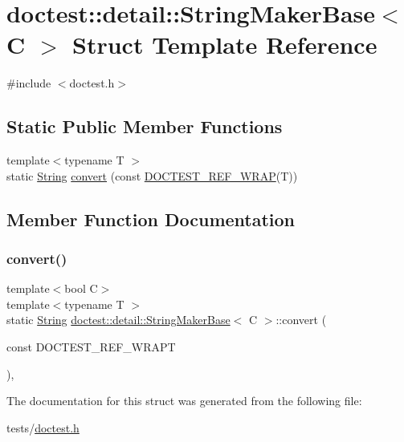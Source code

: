 \hypertarget{structdoctest_1_1detail_1_1StringMakerBase}{}\section{doctest\+:\+:detail\+:\+:String\+Maker\+Base$<$ C $>$ Struct Template Reference}
\label{structdoctest_1_1detail_1_1StringMakerBase}


{\ttfamily \#include $<$doctest.\+h$>$}

\subsection*{Static Public Member Functions}
\begin{DoxyCompactItemize}
\item 
{\footnotesize template$<$typename T $>$ }\\static \hyperlink{classdoctest_1_1String}{String} \hyperlink{structdoctest_1_1detail_1_1StringMakerBase_a67d29f2a5de9a522d8e8607c1a39db9b}{convert} (const \hyperlink{doctest_8h_af2901cafb023c57fb672ccb1bf14f2eb}{D\+O\+C\+T\+E\+S\+T\+\_\+\+R\+E\+F\+\_\+\+W\+R\+AP}(T))
\end{DoxyCompactItemize}


\subsection{Member Function Documentation}
\mbox{\label{structdoctest_1_1detail_1_1StringMakerBase_a67d29f2a5de9a522d8e8607c1a39db9b}} 
\subsubsection{\texorpdfstring{convert()}{convert()}}
{\footnotesize\ttfamily template$<$bool C$>$ \\
template$<$typename T $>$ \\
static \hyperlink{classdoctest_1_1String}{String} \hyperlink{structdoctest_1_1detail_1_1StringMakerBase}{doctest\+::detail\+::\+String\+Maker\+Base}$<$ C $>$\+::convert (\begin{DoxyParamCaption}\item[{const }]{D\+O\+C\+T\+E\+S\+T\+\_\+\+R\+E\+F\+\_\+\+W\+R\+APT }\end{DoxyParamCaption})\hspace{0.3cm}{\ttfamily [inline]}, {\ttfamily [static]}}



The documentation for this struct was generated from the following file\+:\begin{DoxyCompactItemize}
\item 
tests/\hyperlink{doctest_8h}{doctest.\+h}\end{DoxyCompactItemize}
